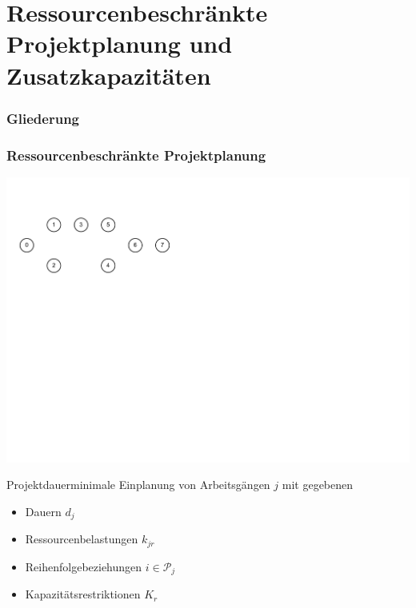 
\section{Ressourcenbeschränkte Projektplanung und Zusatzkapazitäten}

\begin{frame}
\frametitle{Gliederung}
\end{frame}

\begin{frame}[t]
\frametitle{Ressourcenbeschränkte Projektplanung}
\begin{center}
\includegraphics[page=3, width=\textwidth]{images/rcpsp.pdf}\\
\end{center}

{\small
Projektdauerminimale Einplanung von Arbeitsgängen $j$ mit gegebenen
\begin{itemize}
\itemsep0em
\item Dauern $d_j$
\item Ressourcenbelastungen $k_{jr}$
\item Reihenfolgebeziehungen $i \in \mathcal{P}_j$
\item Kapazitätsrestriktionen $K_r$
\end{itemize}
}
\end{frame}


